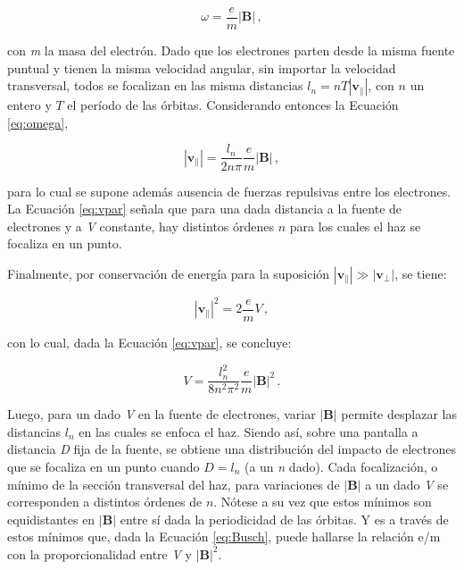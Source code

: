 \begin{equation}
    \omega = \frac{e}{m}|\mathbf{B}|\,,
    \label{eq:omega}
\end{equation}

\noindent con \textit{m} la masa del electrón. Dado que los electrones parten desde la misma fuente puntual y tienen la misma velocidad angular, sin importar la velocidad transversal, todos se focalizan en las misma distancias $l_n = nT|\mathbf{v_\parallel}|$, con $n$ un entero y $T$ el período de las órbitas. Considerando entonces la Ecuación \ref{eq:omega},

\begin{equation}
    |\mathbf{v_\parallel}| = \frac{l_n}{2n\pi}\frac{e}{m}|\mathbf{B}|\,,
    \label{eq:vpar}
\end{equation}

\noindent para lo cual se supone además ausencia de fuerzas repulsivas entre los electrones. La Ecuación \ref{eq:vpar} señala que para una dada distancia a la fuente de electrones y a \textit{V} constante, hay distintos órdenes $n$ para los cuales el haz se focaliza en un punto. 

Finalmente, por conservación de energía para la suposición $|\mathbf{v_\parallel}| \gg |\mathbf{v_\perp}|$, se tiene:

\begin{equation}
    |\mathbf{v_\parallel}|^2 = 2\frac{e}{m}V\,,
\end{equation}

\noindent con lo cual, dada la Ecuación \ref{eq:vpar}, se concluye:

\begin{equation}
    V = \frac{l_n^2}{8n^2\pi^2}\frac{e}{m}|\mathbf{B}|^2\,.
    \label{eq:Busch}
\end{equation}

Luego, para un dado \textit{V} en la fuente de electrones, variar $|\mathbf{B}|$ permite desplazar las distancias $l_n$ en las cuales se enfoca el haz. Siendo así, sobre una pantalla a distancia \textit{D} fija de la fuente, se obtiene una distribución del impacto de electrones que se focaliza en un punto cuando $D = l_n$ (a un \textit{n} dado). Cada focalización, o mínimo de la sección transversal del haz, para variaciones de $|\mathbf{B}|$ a un dado \textit{V} se corresponden a distintos órdenes de $n$. Nótese a su vez que estos mínimos son equidistantes en $|\mathbf{B}|$ entre sí dada la periodicidad de las órbitas. Y es a través de estos mínimos que, dada la Ecuación \ref{eq:Busch}, puede hallarse la relación e/m con la proporcionalidad entre \textit{V} y $|\mathbf{B}|^2$.

